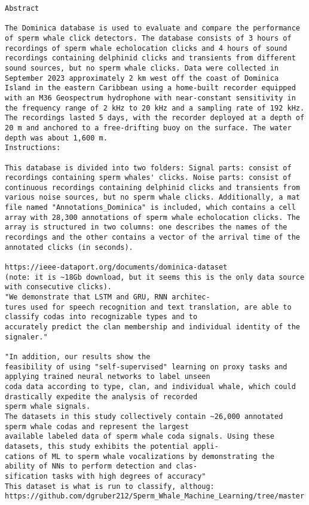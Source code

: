 \documentclass{article}
\begin{document}
\begin{lstlisting}[breaklines=true, breakatwhitespace=true, columns=flexible, basicstyle=\ttfamily\small]
Abstract 

The Dominica database is used to evaluate and compare the performance of sperm whale click detectors. The database consists of 3 hours of recordings of sperm whale echolocation clicks and 4 hours of sound recordings containing delphinid clicks and transients from different sound sources, but no sperm whale clicks. Data were collected in September 2023 approximately 2 km west off the coast of Dominica Island in the eastern Caribbean using a home-built recorder equipped with an M36 Geospectrum hydrophone with near-constant sensitivity in the frequency range of 2 kHz to 20 kHz and a sampling rate of 192 kHz. The recordings lasted 5 days, with the recorder deployed at a depth of 20 m and anchored to a free-drifting buoy on the surface. The water depth was about 1,600 m.
Instructions: 

This database is divided into two folders: Signal parts: consist of recordings containing sperm whales' clicks. Noise parts: consist of continuous recordings containing delphinid clicks and transients from various noise sources, but no sperm whale clicks. Additionally, a mat file named "Annotations_Dominica" is included, which contains a cell array with 28,300 annotations of sperm whale echolocation clicks. The array is structured in two columns: one describes the names of the recordings and the other contains a vector of the arrival time of the annotated clicks (in seconds).

https://ieee-dataport.org/documents/dominica-dataset
(note: it is ~18Gb download, but it seems this is the only data source with consecutive clicks).
"We demonstrate that LSTM and GRU, RNN architec-
tures used for speech recognition and text translation, are able to classify codas into recognizable types and to
accurately predict the clan membership and individual identity of the signaler."

"In addition, our results show the
feasibility of using "self-supervised" learning on proxy tasks and applying trained neural networks to label unseen
coda data according to type, clan, and individual whale, which could drastically expedite the analysis of recorded
sperm whale signals.
The datasets in this study collectively contain ~26,000 annotated sperm whale codas and represent the largest
available labeled data of sperm whale coda signals. Using these datasets, this study exhibits the potential appli-
cations of ML to sperm whale vocalizations by demonstrating the ability of NNs to perform detection and clas-
sification tasks with high degrees of accuracy"
This dataset is what is run to classify, althoug:
https://github.com/dgruber212/Sperm_Whale_Machine_Learning/tree/master

\end{lstlisting}
\end{document}
